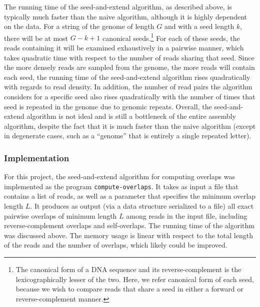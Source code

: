 \documentclass[10pt]{article}
\newcommand{\ProgramName}[1]{{\tt #1}}
\begin{document}
The running time of the seed-and-extend algorithm, as described above, is
typically much faster than the naive algorithm, although it is highly dependent
on the data.  For a string of the genome of length $G$ and with a seed length
$k$, there will be at most $G-k+1$ canonical seeds.\footnote{The canonical form
of a DNA sequence and its reverse-complement is the lexicographically lesser of
the two.  Here, we refer canonical form of each seed, because we wish to compare
reads that share a seed in either a forward or reverse-complement manner.}  For
each of these seeds, the reads containing it will be examined exhaustively in a
pairwise manner, which takes quadratic time with respect to the number of reads
sharing that seed.  Since the more densely reads are sampled from the genome,
the more reads will contain each seed,  the running time of the seed-and-extend
algorithm rises quadratically with regards to read density.  In addition, the
number of read pairs the algorithm considers for a specific seed also rises
quadratically with the number of times that seed is repeated in the genome due
to genomic repeats.  Overall, the seed-and-extend algorithm is not ideal and is
still a bottleneck of the entire assembly algorithm, despite the fact that it is
much faster than the naive algorithm (except in degenerate cases, such as a
``genome'' that is entirely a single repeated letter).

\subsubsection{Implementation}

For this project, the seed-and-extend algorithm for computing overlaps was
implemented as the program \ProgramName{compute-overlaps}.  It takes as input a
file that contains a list of reads, as well as a parameter that specifies the
minimum overlap length $L$.  It produces as output (via a data structure
serialized to a file) all exact pairwise overlaps of minimum length $L$ among
reads in the input file, including reverse-complement overlaps and
self-overlaps.  The running time of the algorithm was discussed above.  The
memory usage is linear with respect to the total length of the reads and the
number of overlaps, which likely could be improved.
\end{document}
